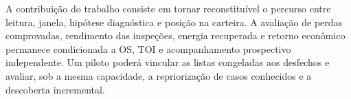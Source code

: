 A contribuição do trabalho consiste em tornar reconstituível o percurso entre leitura, janela, hipótese diagnóstica e posição na carteira. A avaliação de perdas comprovadas, rendimento das inspeções, energia recuperada e retorno econômico permanece condicionada a OS, TOI e acompanhamento prospectivo independente. Um piloto poderá vincular as listas congeladas aos desfechos e avaliar, sob a mesma capacidade, a repriorização de casos conhecidos e a descoberta incremental.

